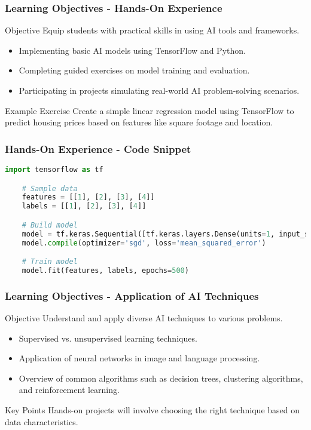\documentclass[aspectratio=169]{beamer}
\begin{document}
\begin{frame}[fragile]
    \frametitle{Learning Objectives - Hands-On Experience}
    \begin{block}{Objective}
        Equip students with practical skills in using AI tools and frameworks.
    \end{block}
    
    \begin{itemize}
        \item Implementing basic AI models using TensorFlow and Python.
        \item Completing guided exercises on model training and evaluation.
        \item Participating in projects simulating real-world AI problem-solving scenarios.
    \end{itemize}
    
    \begin{block}{Example Exercise}
        Create a simple linear regression model using TensorFlow to predict housing prices based on features like square footage and location.
    \end{block}
\end{frame}

\begin{frame}[fragile]
    \frametitle{Hands-On Experience - Code Snippet}
    \begin{lstlisting}[language=Python]
    import tensorflow as tf

    # Sample data
    features = [[1], [2], [3], [4]]
    labels = [[1], [2], [3], [4]]

    # Build model
    model = tf.keras.Sequential([tf.keras.layers.Dense(units=1, input_shape=[1])])
    model.compile(optimizer='sgd', loss='mean_squared_error')

    # Train model
    model.fit(features, labels, epochs=500)
    \end{lstlisting}
\end{frame}

\begin{frame}[fragile]
    \frametitle{Learning Objectives - Application of AI Techniques}
    \begin{block}{Objective}
        Understand and apply diverse AI techniques to various problems.
    \end{block}
    
    \begin{itemize}
        \item Supervised vs. unsupervised learning techniques.
        \item Application of neural networks in image and language processing.
        \item Overview of common algorithms such as decision trees, clustering algorithms, and reinforcement learning.
    \end{itemize}
    
    \begin{block}{Key Points}
        Hands-on projects will involve choosing the right technique based on data characteristics.
    \end{block}
\end{frame}
\end{document}
